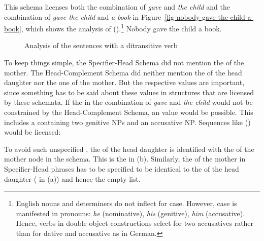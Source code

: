 This schema licenses both the combination of \emph{gave} and \emph{the child} and the combination of
\emph{gave the child} and \emph{a book} in Figure~\vref{fig-nobody-gave-the-child-a-book}, which shows the
analysis of ().\footnote{%
  English nouns and determiners do not inflect for case. However, case is manifested in pronouns:
  \emph{he} (nominative), \emph{his} (genitive), \emph{him} (accusative). Hence, verbs in double object
  constructions select for two accusatives rather than for dative and accusative as in German. 
}
\ea
\label{ex-nobody-gave-the-child-a-book}
Nobody gave the child a book.
\z
\begin{figure}
\caption{\label{fig-nobody-gave-the-child-a-book}Analysis of the sentences with a ditransitive verb}
\end{figure}

To keep things simple, the Specifier-Head Schema did not mention the \compsv of the mother. The
Head-Complement Schema did neither mention the \sprv of the head daughter nor the one of the mother. But the
respective values are important, since something has to be said about these values in structures
that are licensed by these schemata. If the \sprv in the combination of \emph{gave} and \emph{the
  child} would not be constrained by the Head-Complement Schema, an value would be possible. This
includes a \sprl containing two genitive NPs and an accusative NP. Sequences like () would be
licensed:

\z
To avoid such unspecified \sprvs, the \sprv of the head daughter is identified with the \sprv of the
mother node in the schema. This is the  in (b). Similarly, the \compsv of the mother
in Specifier-Head phrases has to be specified to be identical to the \compsv of the head daughter
( in (a)) and hence the empty list.

